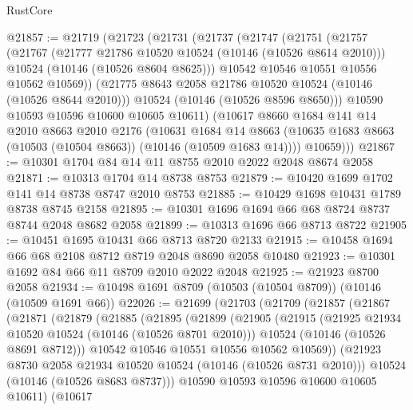 \begin{lexlean}{RustCore}
\begin{coremodule}
@21857 := @21719
    (@21723
      (@21731
        (@21737
          (@21747
            (@21751
              (@21757
                (@21767
                  (@21777 @21786 @10520 @10524 (@10146 (@10526 @8614 @2010)))
                  @10524
                  (@10146 (@10526 @8604 @8625)))
                @10542
                @10546
                @10551
                @10556
                @10562
                @10569))
            (@21775 @8643 @2058 @21786 @10520 @10524 (@10146 (@10526 @8644 @2010)))
            @10524
            (@10146 (@10526 @8596 @8650)))
          @10590
          @10593
          @10596
          @10600
          @10605
          @10611)
        (@10617
          @8660
          @1684
          @141
          @14
          @2010
          @8663
          @2010
          @2176
          (@10631
            @1684
            @14
            @8663
            (@10635 @1683 @8663 (@10503 (@10504 @8663)) (@10146 (@10509 @1683 @14))))
          @10659)))
@21867 := @10301 @1704 @84 @14 @11 @8755 @2010 @2022 @2048 @8674 @2058
@21871 := @10313 @1704 @14 @8738 @8753
@21879 := @10420 @1699 @1702 @141 @14 @8738 @8747 @2010 @8753
@21885 := @10429 @1698 @10431 @1789 @8738 @8745 @2158
@21895 := @10301 @1696 @1694 @66 @68 @8724 @8737 @8744 @2048 @8682 @2058
@21899 := @10313 @1696 @66 @8713 @8722
@21905 := @10451 @1695 @10431 @66 @8713 @8720 @2133
@21915 := @10458 @1694 @66 @68 @2108 @8712 @8719 @2048 @8690 @2058 @10480
@21923 := @10301 @1692 @84 @66 @11 @8709 @2010 @2022 @2048
@21925 := @21923 @8700 @2058
@21934 := @10498 @1691 @8709 (@10503 (@10504 @8709)) (@10146 (@10509 @1691 @66))
@22026 := @21699
    (@21703
      (@21709
        (@21857
          (@21867
            (@21871
              (@21879
                (@21885
                  (@21895
                    (@21899
                      (@21905
                        (@21915
                          (@21925 @21934 @10520 @10524 (@10146 (@10526 @8701 @2010)))
                          @10524
                          (@10146 (@10526 @8691 @8712)))
                        @10542
                        @10546
                        @10551
                        @10556
                        @10562
                        @10569))
                    (@21923 @8730 @2058 @21934 @10520 @10524 (@10146 (@10526 @8731 @2010)))
                    @10524
                    (@10146 (@10526 @8683 @8737)))
                  @10590
                  @10593
                  @10596
                  @10600
                  @10605
                  @10611)
                (@10617

\end{coremodule}
\end{lexlean}
